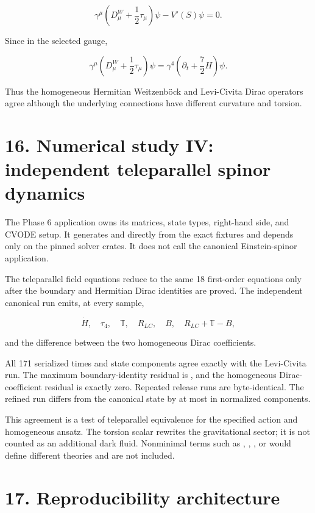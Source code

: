 \documentclass[11pt]{article}
\begin{document}
\[
\gamma^\mu\left(D^W_\mu+\frac12\tau_\mu\right)\psi
-V'(S)\psi=0.
\]

Since \texttt{} in the selected gauge,

\[
\gamma^\mu\left(D^W_\mu+\frac12\tau_\mu\right)\psi
=\gamma^4\left(\partial_t+\frac72H\right)\psi.
\]

Thus the homogeneous Hermitian Weitzenböck and Levi-Civita Dirac operators agree although the underlying connections have different curvature and torsion.

\section{16. Numerical study IV: independent teleparallel spinor dynamics}

The Phase 6 application owns its matrices, state types, right-hand side, and CVODE setup. It generates \texttt{} and \texttt{} directly from the exact fixtures and depends only on the pinned solver crates. It does not call the canonical Einstein-spinor application.

The teleparallel field equations reduce to the same 18 first-order equations only after the boundary and Hermitian Dirac identities are proved. The independent canonical run emits, at every sample,

\[
\dot H,
\quad \tau_4,
\quad \mathbb T,
\quad R_{LC},
\quad B,
\quad R_{LC}+\mathbb T-B,
\]

and the difference between the two homogeneous Dirac coefficients.

All 171 serialized times and state components agree exactly with the Levi-Civita run. The maximum boundary-identity residual is \texttt{}, and the homogeneous Dirac-coefficient residual is exactly zero. Repeated release runs are byte-identical. The refined run differs from the canonical state by at most \texttt{} in normalized components.

This agreement is a test of teleparallel equivalence for the specified action and homogeneous ansatz. The torsion scalar rewrites the gravitational sector; it is not counted as an additional dark fluid. Nonminimal terms such as \texttt{}, \texttt{}, \texttt{}, or \texttt{} would define different theories and are not included.

\section{17. Reproducibility architecture}
\end{document}
